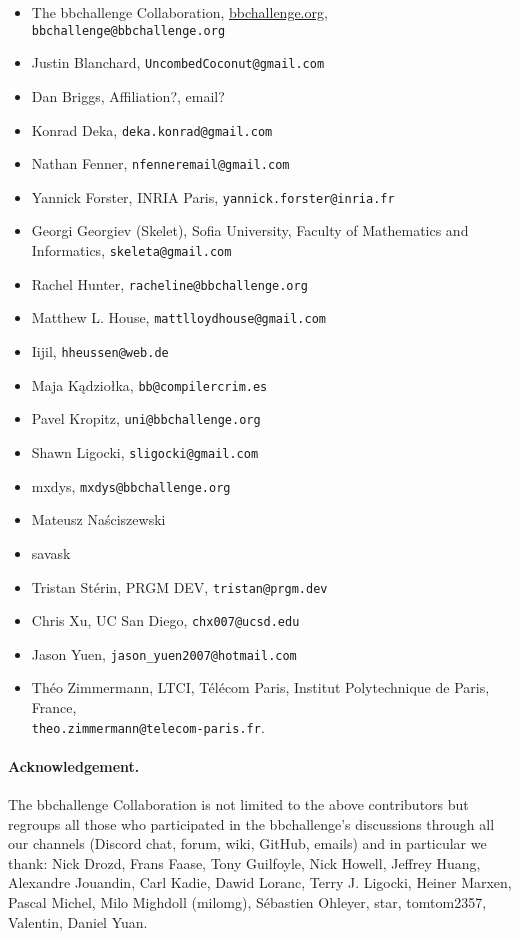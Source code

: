 \documentclass[a4paper,british]{article}
\theoremstyle{definition} %
\numberwithin{equation}{section}
\theoremstyle{definition} %
\newcommand{\ts}[1]{{\color{red}#1}}
\begin{document}
\begin{itemize}
    \item The bbchallenge Collaboration, \url{bbchallenge.org}, \texttt{bbchallenge@bbchallenge.org}
    \item Justin Blanchard, \texttt{UncombedCoconut@gmail.com}
    \item Dan Briggs, \ts{Affiliation?}, \ts{email?}
    \item Konrad Deka, \texttt{deka.konrad@gmail.com}
    \item Nathan Fenner, \texttt{nfenneremail@gmail.com}
    \item Yannick Forster, INRIA Paris, \texttt{yannick.forster@inria.fr}
    \item Georgi Georgiev (Skelet), Sofia University, Faculty of Mathematics and Informatics, \texttt{skeleta@gmail.com}
    \item Rachel Hunter, \texttt{racheline@bbchallenge.org}
    \item Matthew L. House, \texttt{mattlloydhouse@gmail.com}
    \item Iijil, \texttt{hheussen@web.de}
    \item Maja Kądziołka, \texttt{bb@compilercrim.es}
    \item Pavel Kropitz, \texttt{uni@bbchallenge.org}
    \item Shawn Ligocki, \texttt{sligocki@gmail.com}
    \item mxdys, \texttt{mxdys@bbchallenge.org}
    \item Mateusz Na\'{s}ciszewski
    \item savask
    \item Tristan Stérin, PRGM DEV, \texttt{tristan@prgm.dev}
    \item Chris Xu, UC San Diego, \texttt{chx007@ucsd.edu}
    \item Jason Yuen, \texttt{jason\_yuen2007@hotmail.com}
    \item Théo Zimmermann, LTCI, Télécom Paris, Institut Polytechnique de Paris, France, \\ \texttt{theo.zimmermann@telecom-paris.fr}.
\end{itemize}

\paragraph{Acknowledgement.} The bbchallenge Collaboration is not limited to the above contributors but regroups all those who participated in the bbchallenge's discussions through all our channels (Discord chat, forum, wiki, GitHub, emails) and in particular we thank:  Nick Drozd, Frans Faase, Tony Guilfoyle, Nick Howell, Jeffrey Huang, Alexandre Jouandin, Carl Kadie, Dawid Loranc, Terry J. Ligocki, Heiner Marxen, Pascal Michel, Milo Mighdoll (milomg), Sébastien Ohleyer, star, tomtom2357, Valentin, Daniel Yuan.
\end{document}
